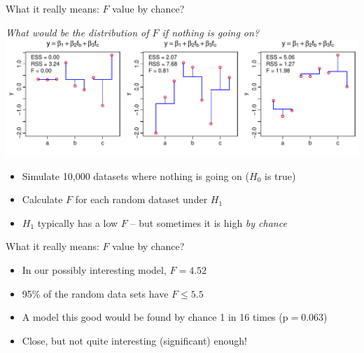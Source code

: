 \documentclass[xcolor=x11names,handout,compress]{beamer}
\renewcommand{\(}{\begin{columns}}
\renewcommand{\)}{\end{columns}}
\newcommand{\<}[1]{\begin{column}{#1}}
\renewcommand{\>}{\end{column}}
\begin{document}
\begin{frame}{What it really means: $F$ value by chance?}

\begin{center}
    \it What would be the distribution of $F$ if nothing is going on?\\
    \pause
    \includegraphics[width=\textwidth]{F_extremes.pdf}
\end{center}

\pause 
\begin{itemize}[<+->]\itemsep6pt
    \item Simulate 10,000 datasets where nothing is going on ($H_0$ is true)
    \item Calculate $F$ for each random dataset under $H_1$
    \item $H_1$ typically has a low $F$ -- but sometimes it is high {\it by chance} 
\end{itemize}

\end{frame}


\begin{frame}{What it really means: $F$ value by chance?}


\centerline{}

\begin{itemize}[<+->]\itemsep6pt
\item In our possibly interesting model, $F = 4.52$
\item 95\% of the random data sets have $F\le 5.5$
\item A model this good would be found by chance 1 in 16 times (p$=0.063$)
\item Close, but not quite interesting (significant) enough!
\end{itemize}

\end{frame}
\end{document}
